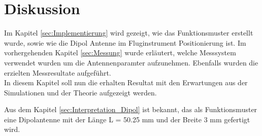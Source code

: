 \chapter{Diskussion}
Im Kapitel \ref{sec:Implementierung} wird gezeigt, wie das Funktionsmuster erstellt wurde, sowie wie die Dipol Antenne  im Fluginstrument Positionierung ist. Im vorhergehenden Kapitel \ref{sec:Messung} wurde erläutert, welche Messsystem verwendet wurden um die Antennenparamter aufzunehmen. Ebenfalls wurden die erzielten Messresultate aufgeführt.\\
In diesem Kapitel soll nun die erhalten Resultat mit den Erwartungen aus der Simulationen und der Theorie aufgezeigt werden.

Aus dem Kapitel \ref{sec:Interpretation_Dipol} ist bekannt, das als Funktionsmuster eine Dipolantenne mit der Länge L = 50.25 mm und der Breite 3 mm gefertigt wird. 

